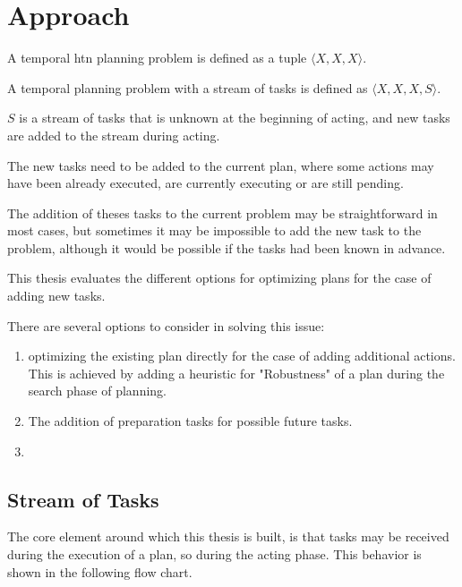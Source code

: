 \section{Approach}\label{sec:approach}


A temporal htn planning problem is defined as a tuple $\langle X,X,X \rangle$.

A temporal planning problem with a stream of tasks is defined as $\langle X,X,X,S \rangle$.

$S$ is a stream of tasks that is unknown at the beginning of acting, and new tasks are added to the stream during acting.

The new tasks need to be added to the current plan, where some actions may have been already executed, are currently executing or are still pending.

The addition of theses tasks to the current problem may be straightforward in most cases, but sometimes it may be impossible to add the new task to the problem, although it would be possible if the tasks had been known in advance.

This thesis evaluates the different options for optimizing plans for the case of adding new tasks.

There are several options to consider in solving this issue:

\begin{enumerate}
    \item optimizing the existing plan directly for the case of adding additional actions. This is achieved by adding a heuristic for "Robustness" of a plan during the search phase of planning.
    \item The addition of preparation tasks for possible future tasks. 
    \item {}
\end{enumerate}


\subsection{Stream of Tasks}

The core element around which this thesis is built, is that tasks may be received during the execution of a plan, so during the acting phase.
This behavior is shown in the following flow chart.


